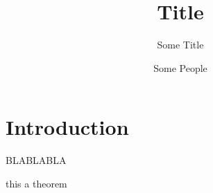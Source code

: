 \documentclass{awesome}
\begin{document}

\title{Title}
\subtitle{Some Title}
\author{Some People}


\makefrontpage



\tableofcontents

\chapter{Introduction}
BLABLABLA
\begin{theorem}
this a theorem
\end{theorem}

\nocite{*}
\printbibliography
\end{document}
